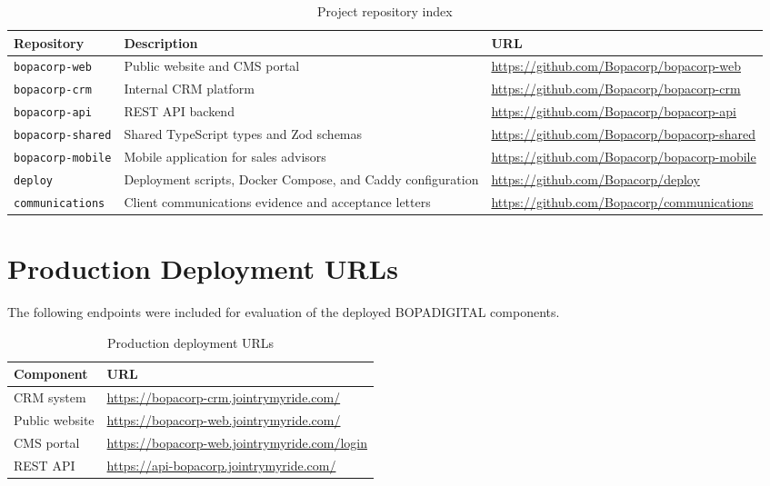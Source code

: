 \documentclass[letterpaper%
, oneside%
, 12pt%
, memoireprojet%
, english%
,creativecommons,hyperref, withAlgo2e %
]{thETS}
\begin{document}
\begin{table}[H]
\centering
\small
\begin{tabular}{|p{3.2cm}|p{6.0cm}|p{4.8cm}|}
\hline
\textbf{Repository} & \textbf{Description} & \textbf{URL} \\
\hline
\texttt{bopacorp-web} & Public website and CMS portal & \url{https://github.com/Bopacorp/bopacorp-web} \\
\hline
\texttt{bopacorp-crm} & Internal CRM platform & \url{https://github.com/Bopacorp/bopacorp-crm} \\
\hline
\texttt{bopacorp-api} & REST API backend & \url{https://github.com/Bopacorp/bopacorp-api} \\
\hline
\texttt{bopacorp-shared} & Shared TypeScript types and Zod schemas & \url{https://github.com/Bopacorp/bopacorp-shared} \\
\hline
\texttt{bopacorp-mobile} & Mobile application for sales advisors & \url{https://github.com/Bopacorp/bopacorp-mobile} \\
\hline
\texttt{deploy} & Deployment scripts, Docker Compose, and Caddy configuration & \url{https://github.com/Bopacorp/deploy} \\
\hline
\texttt{communications} & Client communications evidence and acceptance letters & \url{https://github.com/Bopacorp/communications} \\
\hline
\end{tabular}
\caption{Project repository index}
\label{tab:appendix_repository_index}
\end{table}

\section{Production Deployment URLs}
The following endpoints were included for evaluation of the deployed BOPADIGITAL components.

\begin{table}[H]
\centering
\small
\begin{tabular}{|p{4.2cm}|p{9.8cm}|}
\hline
\textbf{Component} & \textbf{URL} \\
\hline
CRM system & \url{https://bopacorp-crm.jointrymyride.com/} \\
\hline
Public website & \url{https://bopacorp-web.jointrymyride.com/} \\
\hline
CMS portal & \url{https://bopacorp-web.jointrymyride.com/login} \\
\hline
REST API & \url{https://api-bopacorp.jointrymyride.com/} \\
\hline
\end{tabular}
\caption{Production deployment URLs}
\label{tab:appendix_deployment_urls}
\end{table}
\end{document}

